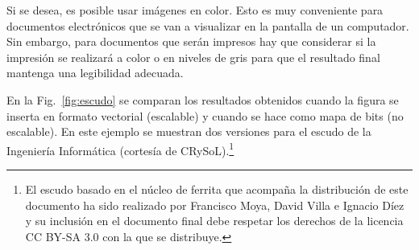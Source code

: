 \documentclass[11pt,a4paper]{article}
\begin{document}
Si se desea, es posible usar imágenes en color. Esto es muy conveniente para documentos electrónicos que se van a visualizar en la pantalla de un computador. Sin embargo, para documentos que serán impresos hay que considerar si la impresión se realizará a color o en niveles de gris para que el resultado final mantenga una legibilidad adecuada. 

En la Fig.~\ref{fig:escudo} se comparan los resultados obtenidos cuando la figura se inserta en formato vectorial (escalable) y cuando se hace como mapa de bits (no escalable). En este ejemplo se muestran dos versiones para el escudo de la Ingeniería Informática (cortesía de CRySoL).\footnote{El escudo basado en el núcleo de ferrita que acompaña la distribución de este documento ha sido realizado por Francisco Moya, David Villa e Ignacio Díez y su inclusión en el documento final debe respetar los derechos de la licencia CC BY-SA 3.0 con la que se distribuye.}
\end{document}
